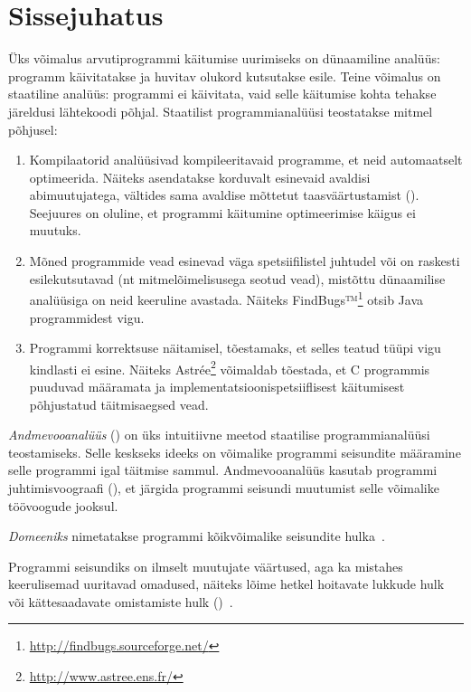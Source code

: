 \documentclass[../thesis.tex]{subfiles}
\begin{document}
\section{Sissejuhatus}

Üks võimalus arvutiprogrammi käitumise uurimiseks on dünaamiline analüüs: programm käivitatakse ja huvitav olukord kutsutakse esile. Teine võimalus on staatiline analüüs: programmi ei käivitata, vaid selle käitumise kohta tehakse järeldusi lähtekoodi põhjal. Staatilist programmianalüüsi teostatakse mitmel põhjusel:
\begin{enumerate}
	\item Kompilaatorid analüüsivad kompileeritavaid programme, et neid automaatselt optimeerida. Näiteks asendatakse korduvalt esinevaid avaldisi abimuutujatega, vältides sama avaldise mõttetut taasväärtustamist (). Seejuures on oluline, et programmi käitumine optimeerimise käigus ei muutuks. 

	\item Mõned programmide vead esinevad väga spetsiifilistel juhtudel või on raskesti esilekutsutavad (nt mitmelõimelisusega seotud vead), mistõttu dünaamilise analüüsiga on neid keeruline avastada. Näiteks FindBugs™\footnote{\url{http://findbugs.sourceforge.net/}} otsib Java programmidest vigu.

	\item Programmi korrektsuse näitamisel, tõestamaks, et selles teatud tüüpi vigu kindlasti ei esine. Näiteks Astrée\footnote{\url{http://www.astree.ens.fr/}} võimaldab tõestada, et C programmis puuduvad määramata ja implementatsioonispetsiiflisest käitumisest põhjustatud täitmisaegsed vead.
\end{enumerate}

\emph{Andmevooanalüüs} () on üks intuitiivne meetod staatilise programmianalüüsi teostamiseks. Selle keskseks ideeks on võimalike programmi seisundite määramine selle programmi igal täitmise sammul. Andmevooanalüüs kasutab programmi juhtimisvoograafi (), et järgida programmi seisundi muutumist selle võimalike töövoogude jooksul.

\begin{definition}
\emph{Domeeniks} nimetatakse programmi kõikvõimalike seisundite hulka~\cite{vojdani_magister}.
\end{definition}

Programmi seisundiks on ilmselt muutujate väärtused, aga ka mistahes keerulisemad uuritavad omadused, näiteks lõime hetkel hoitavate lukkude hulk~\cite{vojdani_magister} või kättesaadavate omistamiste hulk ()~\cite[12]{seidl_foundations}.
\end{document}
